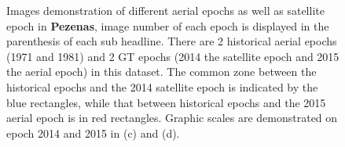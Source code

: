 \begin{figure}[htbp]
\begin{center}
{\begin{minipage}[t]{0.48\linewidth}
    	\end{minipage}%
    }
        \caption{Images demonstration of different aerial epochs as well as satellite epoch in \textbf{Pezenas}, image number of each epoch is displayed in the parenthesis of each sub headline. There are 2 historical aerial epochs (1971 and 1981) and 2 \ac{GT} epochs (2014 the satellite epoch and 2015 the aerial epoch) in this dataset. The common zone between the historical epochs and the 2014 satellite epoch is indicated by the blue rectangles, while that between historical epochs and the 2015 aerial epoch is in red rectangles. Graphic scales are demonstrated on epoch 2014 and 2015 in (c) and (d).}
        \label{PezenasData}
    \end{center}
\end{figure} 



